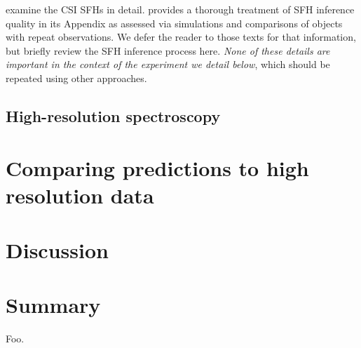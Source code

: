 \documentclass[a4paper,fleqn,usenatbib]{mnras}
\begin{document}
\citet{Dressler16, Dressler18} examine the CSI SFHs in detail. \citet{Dressler18} provides a thorough treatment 
of SFH inference quality in its Appendix as assessed via simulations and comparisons of objects with repeat 
observations. We defer the reader to those texts for that information, but briefly review the SFH inference 
process here. {\it None of these details are important in the context of the experiment we detail below}, which 
should be repeated using other approaches.

\subsection{High-resolution spectroscopy}
\label{sec: hiRes}




\section{Comparing predictions to high resolution data}
\label{sec:results}



\section{Discussion}
\label{sec:discussion}



\section{Summary}
\label{sec:summary}

Foo.\\
\end{document}
